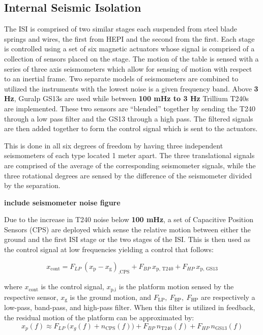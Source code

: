 \documentclass [12pt, proquest]{uwthesis}[2019]
\begin{document}
\subsection{Internal Seismic Isolation}

The ISI is comprised of two similar stages each suspended from steel blade springs and wires, the first from HEPI and the second from the first. Each stage is controlled using a set of six magnetic actuators whose signal is comprised of a collection of sensors placed on the stage. The motion of the table is sensed with a series of three axis seismometers which allow for sensing of motion with respect to an inertial frame. Two separate models of seismometers are combined to utilized the instruments with the lowest noise is a given frequency band. Above \textbf{3 Hz}, Guralp GS13s are used while between \textbf{100 mHz to 3 Hz} Trillium T240s are implemented. These two sensors are ``blended'' together by sending the T240 through a low pass filter and the GS13 through a high pass. The filtered signals are then added together to form the control signal which is sent to the actuators. 

This is done in all six degrees of freedom by having three independent seismometers of each type located 1 meter apart. The three translational signals are comprised of the average of the corresponding seismometer signals, while the three rotational degrees are sensed by the difference of the seismometer divided by the separation.

\textbf{include seismometer noise figure}

Due to the increase in T240 noise below \textbf{100 mHz}, a set of Capacitive Position Sensors (CPS) are deployed which sense the relative motion between either the ground and the first ISI stage or the two stages of the ISI. This is then used as the control signal at low frequencies yielding a control that follows:

\begin{equation}
x_\text{cont}=F_{LP}\ (x_\text{p}-x_\text{g})_\text{,CPS}+F_{BP}\ x_\text{p, T240}+F_{HP}\ x_\text{p, GS13}
\end{equation}

where $x_\text{cont}$ is the control signal, $x_\text{p,i}$ is the platform motion sensed by the respective sensor, $x_\text{g}$ is the ground motion, and $F_\text{LP},\  F_\text{BP},\ F_\text{HP}$ are respectively a low-pass, band-pass, and high-pass filter. When this filter is utilized in feedback, the residual motion of the platform can be approximated by:
\begin{equation}
x_p(f)\approx F_{LP}\ \big(x_g(f)+n_\text{CPS}(f)\big)+F_{BP}\ n_\text{T240}(f)+F_{HP}\ n_\text{GS13}(f)
\end{equation}
\end{document}

